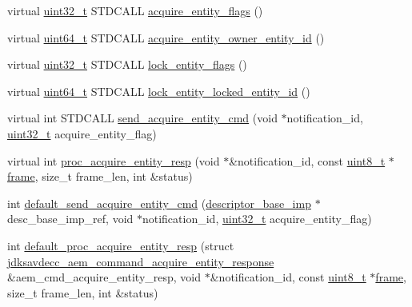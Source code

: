 \begin{DoxyCompactItemize}
\item 
virtual \hyperlink{parse_8c_a6eb1e68cc391dd753bc8ce896dbb8315}{uint32\+\_\+t} S\+T\+D\+C\+A\+LL \hyperlink{classavdecc__lib_1_1descriptor__base__imp_a2d270d205bcea948cf61311a1f8336c6}{acquire\+\_\+entity\+\_\+flags} ()
\item 
virtual \hyperlink{parse_8c_aec6fcb673ff035718c238c8c9d544c47}{uint64\+\_\+t} S\+T\+D\+C\+A\+LL \hyperlink{classavdecc__lib_1_1descriptor__base__imp_a507b250a984bb5611d2699cd26d60a51}{acquire\+\_\+entity\+\_\+owner\+\_\+entity\+\_\+id} ()
\item 
virtual \hyperlink{parse_8c_a6eb1e68cc391dd753bc8ce896dbb8315}{uint32\+\_\+t} S\+T\+D\+C\+A\+LL \hyperlink{classavdecc__lib_1_1descriptor__base__imp_afe2564a2a32f83deced28efa17f332e2}{lock\+\_\+entity\+\_\+flags} ()
\item 
virtual \hyperlink{parse_8c_aec6fcb673ff035718c238c8c9d544c47}{uint64\+\_\+t} S\+T\+D\+C\+A\+LL \hyperlink{classavdecc__lib_1_1descriptor__base__imp_aeb8f096d55f82522516cbf00a616246a}{lock\+\_\+entity\+\_\+locked\+\_\+entity\+\_\+id} ()
\item 
virtual int S\+T\+D\+C\+A\+LL \hyperlink{classavdecc__lib_1_1descriptor__base__imp_aea9e3053b75477816c15487d3e9a6f70}{send\+\_\+acquire\+\_\+entity\+\_\+cmd} (void $\ast$notification\+\_\+id, \hyperlink{parse_8c_a6eb1e68cc391dd753bc8ce896dbb8315}{uint32\+\_\+t} acquire\+\_\+entity\+\_\+flag)
\item 
virtual int \hyperlink{classavdecc__lib_1_1descriptor__base__imp_a934de13d0b017574d514ce276180a004}{proc\+\_\+acquire\+\_\+entity\+\_\+resp} (void $\ast$\&notification\+\_\+id, const \hyperlink{stdint_8h_aba7bc1797add20fe3efdf37ced1182c5}{uint8\+\_\+t} $\ast$\hyperlink{gst__avb__playbin_8c_ac8e710e0b5e994c0545d75d69868c6f0}{frame}, size\+\_\+t frame\+\_\+len, int \&status)
\item 
int \hyperlink{classavdecc__lib_1_1descriptor__base__imp_a4ee5f42b89a728627bf1340afebc7c82}{default\+\_\+send\+\_\+acquire\+\_\+entity\+\_\+cmd} (\hyperlink{classavdecc__lib_1_1descriptor__base__imp}{descriptor\+\_\+base\+\_\+imp} $\ast$desc\+\_\+base\+\_\+imp\+\_\+ref, void $\ast$notification\+\_\+id, \hyperlink{parse_8c_a6eb1e68cc391dd753bc8ce896dbb8315}{uint32\+\_\+t} acquire\+\_\+entity\+\_\+flag)
\item 
int \hyperlink{classavdecc__lib_1_1descriptor__base__imp_ad248d7d7060e28eb36c8dc37d2653c43}{default\+\_\+proc\+\_\+acquire\+\_\+entity\+\_\+resp} (struct \hyperlink{structjdksavdecc__aem__command__acquire__entity__response}{jdksavdecc\+\_\+aem\+\_\+command\+\_\+acquire\+\_\+entity\+\_\+response} \&aem\+\_\+cmd\+\_\+acquire\+\_\+entity\+\_\+resp, void $\ast$\&notification\+\_\+id, const \hyperlink{stdint_8h_aba7bc1797add20fe3efdf37ced1182c5}{uint8\+\_\+t} $\ast$\hyperlink{gst__avb__playbin_8c_ac8e710e0b5e994c0545d75d69868c6f0}{frame}, size\+\_\+t frame\+\_\+len, int \&status)

\end{DoxyCompactItemize}
